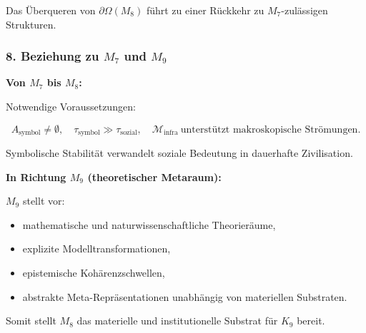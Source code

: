 Das Überqueren von $\partial\Omega(M_8)$ führt zu einer Rückkehr zu $M_7$-zulässigen Strukturen.

\subsubsection*{8. Beziehung zu \texorpdfstring{$M_7$}{M_7} und \texorpdfstring{$M_9$}{M_9}}

\textbf{Von $M_7$ bis $M_8$:}

Notwendige Voraussetzungen:

\[
A_{\mathrm{symbol}} \neq \emptyset,
\quad
\tau_{\mathrm{symbol}} \gg \tau_{\mathrm{sozial}},
\quad
\mathcal{M}_{\mathrm{infra}}\ \text{unterstützt makroskopische Strömungen}.
\]

Symbolische Stabilität verwandelt soziale Bedeutung in dauerhafte Zivilisation.

\textbf{In Richtung $M_9$ (theoretischer Metaraum):}

$M_9$ stellt vor:

\begin{itemize}
    \item mathematische und naturwissenschaftliche Theorieräume,
    \item explizite Modelltransformationen,
    \item epistemische Kohärenzschwellen,
    \item abstrakte Meta-Repräsentationen unabhängig von materiellen Substraten.
\end{itemize}

Somit stellt $M_8$ das materielle und institutionelle Substrat für $K_9$ bereit.
